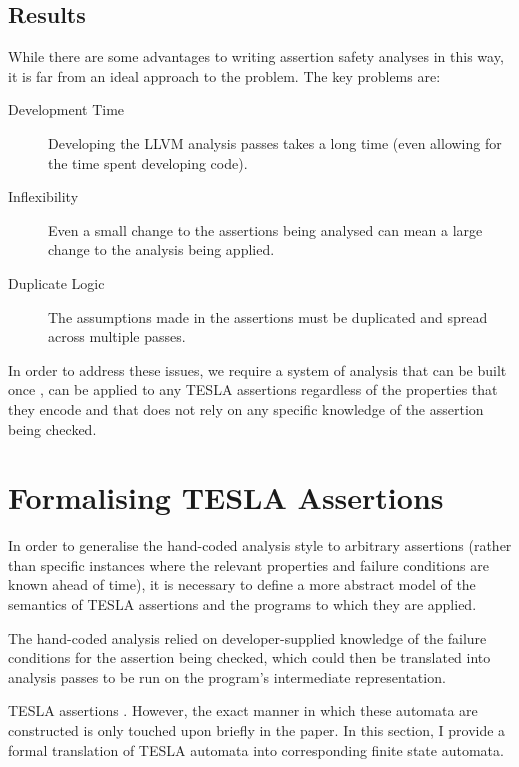 \subsection{Results}

While there are some advantages to writing assertion safety analyses in
this way, it is far from an ideal approach to the problem. The key
problems are:
\begin{description}
  \item[Development Time] Developing the LLVM analysis passes takes a
    long time (even allowing for the time spent developing
     code).
  \item[Inflexibility] Even a small change to the assertions being
    analysed can mean a large change to the analysis being applied.
  \item[Duplicate Logic] The assumptions made in the assertions must be
    duplicated and spread across multiple passes.
\end{description}

In order to address these issues, we require a system of analysis that can be
built once , can be applied to any TESLA assertions
regardless of the properties that they encode and that does not rely on any
specific knowledge of the assertion being checked.

\section{Formalising TESLA Assertions} \label{sec:formal}

In order to generalise the hand-coded analysis style to arbitrary assertions
(rather than specific instances where the relevant properties and failure
conditions are known ahead of time), it is necessary to define a more abstract
model of the semantics of TESLA assertions and the programs to which they are
applied.

The hand-coded analysis relied on developer-supplied knowledge of the failure
conditions for the assertion being checked, which could then be translated into
analysis passes to be run on the program's intermediate representation.

TESLA assertions . However, the exact manner in which these automata are constructed is
only touched upon briefly in the paper. In this section, I provide a formal
translation of TESLA automata into corresponding finite state automata.

